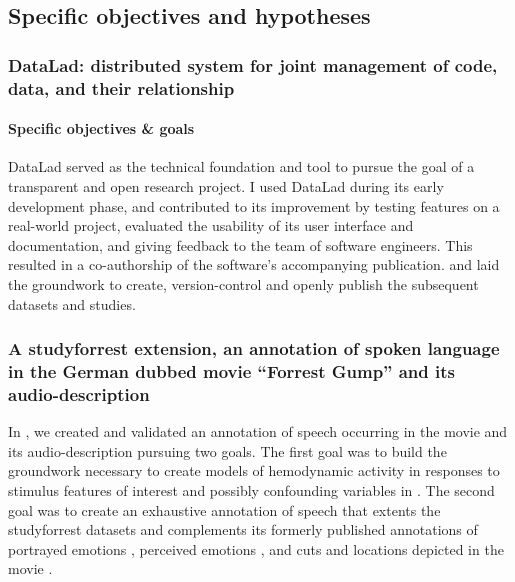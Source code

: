 \pagebreak





\subsection{Specific objectives and hypotheses}




\subsubsection{DataLad: distributed system for joint management of code, data,
and their relationship}


\paragraph{Specific objectives \& goals}
%
DataLad served as the technical foundation and tool to pursue the goal of a
transparent and open research project.
%
I used DataLad during its early development phase, and contributed to its
improvement by testing features on a real-world project, evaluated the usability
of its user interface and documentation, and giving feedback to the team of
software engineers.
%
This resulted in a co-authorship of the software's accompanying publication.
\citep[cf.][]{halchenko2021datalad} and laid the groundwork to create,
version-control and openly publish the subsequent datasets and studies.


\subsubsection{A studyforrest extension, an annotation of spoken language in the
German dubbed movie ``Forrest Gump'' and its audio-description}

In \citet{haeusler2021speechanno}, we created and validated an annotation of
speech occurring in the movie and its audio-description pursuing two goals.
The first goal was to build the groundwork necessary to create models of
hemodynamic activity in responses to stimulus features of interest and possibly
confounding variables in \citet{haeusler2022processing}.
The second goal was to create an exhaustive annotation of speech that extents
the studyforrest datasets and complements its formerly published annotations of
portrayed emotions \citep{labs2015portrayed}, perceived emotions
\citep{lettieri2019emotionotopy}, and cuts and locations depicted in the movie
\citep{haeusler2016cutanno}.

